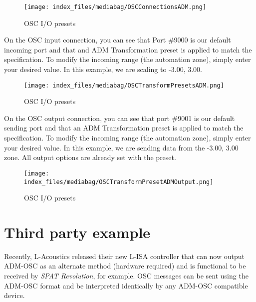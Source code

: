 \documentclass[
  letterpaper,
  DIV=11,
  numbers=noendperiod]{scrreport}
\begin{document}
\begin{figure}

{\centering \texttt{[image: index\_files/mediabag/OSCConnectionsADM.png]}

}

\caption{OSC I/O presets}

\end{figure}

On the OSC input connection, you can see that Port \#9000 is our default
incoming port and that and ADM Transformation preset is applied to match
the specification. To modify the incoming range (the automation zone),
simply enter your desired value. In this example, we are scaling to
-3.00, 3.00.

\begin{figure}

{\centering \texttt{[image: index\_files/mediabag/OSCTransformPresetsADM.png]}

}

\caption{OSC I/O presets}

\end{figure}

On the OSC output connection, you can see that port \#9001 is our
default sending port and that an ADM Transformation preset is applied to
match the specification. To modify the incoming range (the automation
zone), simply enter your desired value. In this example, we are sending
data from the -3.00, 3.00 zone. All output options are already set with
the preset.

\begin{figure}

{\centering \texttt{[image: index\_files/mediabag/OSCTransformPresetADMOutput.png]}

}

\caption{OSC I/O presets}

\end{figure}

\hypertarget{third-party-example}{%
\section{Third party example}\label{third-party-example}}

Recently, L-Acoustics released their new L-ISA controller that can now
output ADM-OSC as an alternate method (hardware required) and is
functional to be received by \emph{SPAT Revolution}, for example. OSC
messages can be sent using the ADM-OSC format and be interpreted
identically by any ADM-OSC compatible device.
\end{document}
